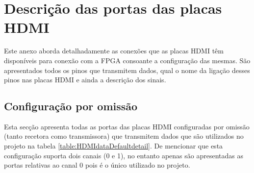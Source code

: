 \chapter{Descrição das portas das placas HDMI} \label{ap1:HDMI}

Este anexo aborda detalhadamente as conexões que as placas HDMI têm disponíveis para conexão com a FPGA consoante a configuração das mesmas. São apresentados todos os pinos que transmitem dados, qual o nome da ligação desses pinos nas placas HDMI e ainda a descrição dos sinais.
\section{Configuração por omissão} \label{ap1:default}

Esta secção apresenta todas as portas das placas HDMI configuradas por omissão (tanto recetora como transmissora) que transmitem dados que são utilizados no projeto na tabela \ref{table:HDMIdataDefaultdetail}. De mencionar que esta configuração suporta dois canais (0 e 1), no entanto apenas são apresentadas as portas relativas ao canal 0 pois é o único utilizado no projeto.

